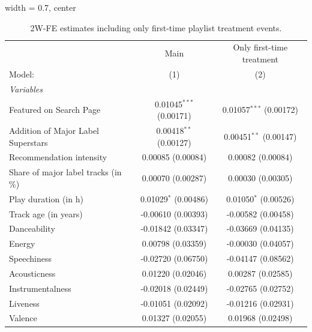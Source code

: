 
\begin{table}[htbp]
   \centering
   \begin{adjustbox}{width = 0.7\textwidth, center}
      \begin{threeparttable}[b]
         \caption{\label{tab:2wfecompare} 2W-FE estimates including only first-time playlist treatment events.}
         \begin{tabular}{lcc}
            \tabularnewline \midrule \midrule
                                                   & Main                      & Only first-time treatment \\   
            Model:                                 & (1)                       & (2)\\  
            \midrule
            \emph{Variables}\\
            Featured on Search Page                & 0.01045$^{***}$ (0.00171) & 0.01057$^{***}$ (0.00172)\\   
            Addition of Major Label Superstars     & 0.00418$^{**}$ (0.00127)  & 0.00451$^{**}$ (0.00147)\\   
            Recommendation intensity               & 0.00085 (0.00084)         & 0.00082 (0.00084)\\   
            Share of major label tracks (in \%)    & 0.00070 (0.00287)         & 0.00030 (0.00305)\\   
            Play duration (in h)                   & 0.01029$^{*}$ (0.00486)   & 0.01050$^{*}$ (0.00526)\\   
            Track age (in years)                   & -0.00610 (0.00393)        & -0.00582 (0.00458)\\   
            Danceability                           & -0.01842 (0.03347)        & -0.03669 (0.04135)\\   
            Energy                                 & 0.00798 (0.03359)         & -0.00030 (0.04057)\\   
            Speechiness                            & -0.02720 (0.06750)        & -0.04147 (0.08562)\\   
            Acousticness                           & 0.01220 (0.02046)         & 0.00287 (0.02585)\\   
            Instrumentalness                       & -0.02018 (0.02449)        & -0.02765 (0.02752)\\   
            Liveness                               & -0.01051 (0.02092)        & -0.01216 (0.02931)\\   
            Valence                                & 0.01327 (0.02055)         & 0.01968 (0.02498)\\   

\end{tabular}
\end{threeparttable}
\end{adjustbox}
\end{table}
